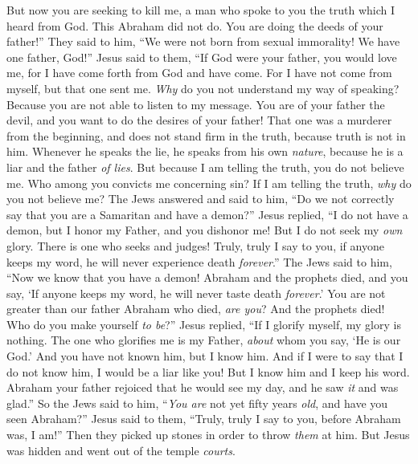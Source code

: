 \begin{biblechapter}
\verse But now you are seeking to kill me, a man who spoke to you the truth which I heard from God. This Abraham did not do.
\verse You are doing the deeds of your father!”
\verse They said to him, “We were not born from sexual immorality! We have one father, God!”
\verse Jesus said to them, “If God were your father, you would love me, for I have come forth from God and have come. For I have not come from myself, but that one sent me.
\verse \textit{Why} do you not understand my way of speaking? Because you are not able to listen to my message.
\verse You are of your father the devil, and you want to do the desires of your father! That one was a murderer from the beginning, and does not stand firm in the truth, because truth is not in him. Whenever he speaks the lie, he speaks from his own \textit{nature}, because he is a liar and the father \textit{of lies}.
\verse But because I am telling the truth, you do not believe me.
\verse Who among you convicts me concerning sin? If I am telling the truth, \textit{why} do you not believe me?
\verse The Jews answered and said to him, “Do we not correctly say that you are a Samaritan and have a demon?”
\verse Jesus replied, “I do not have a demon, but I honor my Father, and you dishonor me!
\verse But I do not seek my \textit{own} glory. There is one who seeks and judges!
\verse Truly, truly I say to you, if anyone keeps my word, he will never experience death \textit{forever}.”
\verse The Jews said to him, “Now we know that you have a demon! Abraham and the prophets died, and you say, ‘If anyone keeps my word, he will never taste death \textit{forever}.’
\verse You are not greater than our father Abraham who died, \textit{are you}? And the prophets died! Who do you make yourself \textit{to be}?”
\verse Jesus replied, “If I glorify myself, my glory is nothing. The one who glorifies me is my Father, \textit{about} whom you say, ‘He is our God.’
\verse And you have not known him, but I know him. And if I were to say that I do not know him, I would be a liar like you! But I know him and I keep his word.
\verse Abraham your father rejoiced that he would see my day, and he saw \textit{it} and was glad.”
\verse So the Jews said to him, “\textit{You are} not yet fifty years \textit{old}, and have you seen Abraham?”
\verse Jesus said to them, “Truly, truly I say to you, before Abraham was, I am!”
\verse Then they picked up stones in order to throw \textit{them} at him. But Jesus was hidden and went out of the temple \textit{courts}.
\end{biblechapter}

